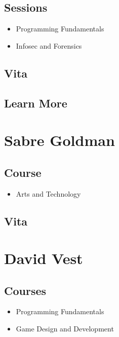 \documentclass[letterpaper,10pt,english]{sphinxmanual}
\begin{document}
\subsection{Sessions}
\label{faculty:sessions}\begin{itemize}
\item {} 
Programming Fundamentals

\item {} 
Infosec and Forensics

\end{itemize}


\subsection{Vita}
\label{faculty:vita}

\subsection{Learn More}
\label{faculty:learn-more}

\section{Sabre Goldman}
\label{faculty:sabre-goldman}

\subsection{Course}
\label{faculty:course}\begin{itemize}
\item {} 
Arts and Technology

\end{itemize}


\subsection{Vita}
\label{faculty:id1}

\section{David Vest}
\label{faculty:david-vest}

\subsection{Courses}
\label{faculty:courses}\begin{itemize}
\item {} 
Programming Fundamentals

\item {} 
Game Design and Development

\end{itemize}
\end{document}
